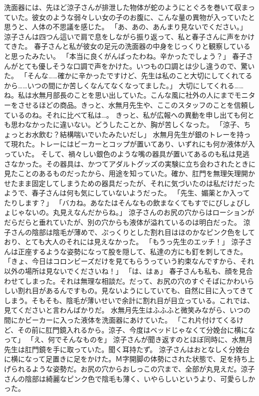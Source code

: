 洗面器には、先ほど涼子さんが排泄した物体が蛇のようにとぐろを巻いて収まっていた。彼女のような弱々しい女の子のお腹に、こんな量の異物が入っていたと思うと、人体の不思議を感じた。
「あ、あの、あんまり見ないでください。」
涼子さんは四つん這いで肩で息をしながら振り返って、私と春子さんに声をかけてきた。
春子さんと私が彼女の足元の洗面器の中身をじっくりと観察していると思ったみたい。
「本当に良くがんばったわね。辛かったでしょう？」
春子さんがとても優しそうな口調で声をかけた。いつもの口調とは少し違うので、驚いた。
「そんな……確かに辛かったですけど、先生は私のこと大切にしてくれてるから……いつの間にか苦しくなんてなくなってました。」
大切にしてくれる……ね。私は水無月部長のことを思い出していた。こんな風に社外の人にまでモニターをさせるほどの商品。きっと、水無月先生や、ここのスタッフのことを信頼しているのね。それに比べて私は…。
きっと、私が広報への異動を申し出ても何とも思わなかったに違いない。どうしたことか、胸が苦しくなった。
「涼子、ちょっとお水飲む？結構喘いでいたみたいだし」
水無月先生が銀のトレーを持って現れた。トレーにはビーカーとコップが置いてあり、いずれにも何か液体が入っていた。
そして、禍々しい銀色のような嘴の器具が置いてあるのも私は見逃さなかった。その器具は、かつてアダルトグッズの実験に立ち会わされたときに見たことのあるものだったから、用途を知っていた。確か、肛門を無理矢理開かせたまま固定してしまうための器具だったが、それに気づいたのは私だけだったようで、春子さんは何も気にしていないようだった。
「先生、媚薬とか入ってたりします？」
「バカね。あなたはそんなもの飲まなくてもすでにびしょびしょじゃないの。丸見えなんだからね。」
涼子さんのお尻の穴からはローションがだらだらと垂れていたが、別の穴からも液体が溢れているのは明白だった。
涼子さんの陰部は陰毛が薄めで、ぷっくりとした割れ目はほのかなピンク色をしており、とても大人のそれには見えなかった。
「もうっ先生のエッチ！」
涼子さんは正座するような姿勢になって股を隠して、私達の方にも釘を刺してきた。
「きょ、今日はコロンビーズだけを見てもらうっていう約束なんですから、それ以外の場所は見ないでくださいね！」
「は、はぁ」
春子さんも私も、顔を見合わせてしまった。それは無理な相談だ。だって、お尻の穴のすぐそばにかわいらしい割れ目があるんですもの。見ないようにしていても、自然に目に入ってきてしまう。そもそも、陰毛が薄いせいで余計に割れ目が目立っている。これでは、見てくださいと言わんばかりだ。
水無月先生はふふふと微笑みながら、いつの間にかビーカーに入った液体を洗面器にあけていた。
「これ片付けてくるけど、その前に肛門鏡入れるから。涼子、今度はベッドじゃなくて分娩台に横になって」
「え、何でそんなものを」
涼子さんが聞き返すのとほぼ同時に、水無月先生は肛門鏡を手に取っていた。聞く耳持たず。
涼子さんはおとなしく分娩台に横になって足置きに足をかけた。Ｍ字開脚の体勢にされた状態で、足を持ち上げられるような姿勢だ。お尻の穴からおしっこの穴まで、全部が丸見えだ。涼子さんの陰部は綺麗なピンク色で陰毛も薄く、いやらしいというより、可愛らしかった。
